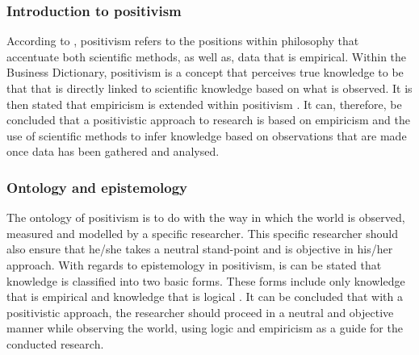 \subsubsection{Introduction to positivism} 
According to \cite{Jakobsen2013}, positivism refers to the positions within philosophy that accentuate both scientific methods, as well as, data that is empirical. Within the Business Dictionary, positivism is a concept that perceives true knowledge to be that that is directly linked to scientific knowledge based on what is observed. It is then stated that empiricism is extended within positivism \citep{schrag1992defense}. 
It can, therefore, be concluded that a positivistic approach to research is based on empiricism and the use of scientific methods to infer knowledge based on observations that are made once data has been gathered and analysed.
\subsubsection{Ontology and epistemology}
The ontology of positivism is to do with the way in which the world is observed, measured and modelled by a specific researcher. This specific researcher should also ensure that he/she takes a neutral stand-point and is objective in his/her approach. 
With regards to epistemology in positivism, is can be stated that knowledge is classified into two basic forms. These forms include only knowledge that is empirical and knowledge that is logical \citep{OatesJ2006}.
It can be concluded that with a positivistic approach, the researcher should proceed in a neutral and objective manner while observing the world, using logic and empiricism as a guide for the conducted research.
